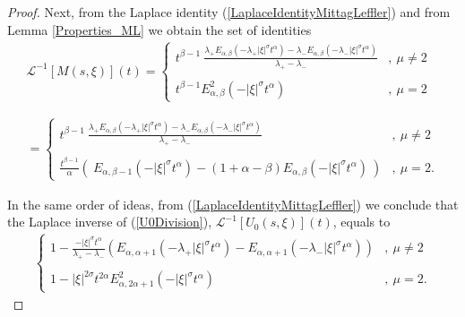 \documentclass{amsart}
\theoremstyle{definition}
\theoremstyle{remark}
\numberwithin{equation}{section}
\begin{document}
\begin{proof}
	Next, from the Laplace identity (\ref{LaplaceIdentityMittagLeffler}) and from Lemma \ref{Properties_ML} we obtain the set of identities
	\begin{eqnarray}\label{MLaplaceInverse}
			\mathcal{L}^{-1}[M(s,\xi)](t)=
			\begin{cases}
				\displaystyle 	t^{\beta-1}~\frac{\lambda_+E_{\alpha,\beta}(-\lambda_+|\xi|^\sigma t^\alpha)-\lambda_-E_{\alpha,\beta}(-\lambda_-|\xi|^\sigma t^\alpha)}{\lambda_+-\lambda_-}&,~\mu\neq 2 \\ \ \\
				\displaystyle t^{\beta-1}E_{\alpha,\beta}^2(-|\xi|^\sigma t^{\alpha})&,~\mu= 2
			\end{cases}\nonumber \\ \nonumber \\ \nonumber \\ 
			=
			\begin{cases}
				\displaystyle 	t^{\beta-1}~\frac{\lambda_+E_{\alpha,\beta}(-\lambda_+|\xi|^\sigma t^\alpha)-\lambda_-E_{\alpha,\beta}(-\lambda_-|\xi|^\sigma t^\alpha)}{\lambda_+-\lambda_-}&,~\mu\neq 2 \\ \ \\
				\displaystyle \frac{t^{\beta-1}}{\alpha}\left(~E_{\alpha,\beta-1}(-|\xi|^\sigma t^{\alpha})-(1+\alpha-\beta)E_{\alpha,\beta}(-|\xi|^\sigma t^{\alpha})~\right)&,~\mu= 2.
			\end{cases} 
	\end{eqnarray}
	
	In the same order of ideas, from (\ref{LaplaceIdentityMittagLeffler}) 
	we conclude that the Laplace inverse of (\ref{U0Division}), $\mathcal{L}^{-1}[U_0(s,\xi)](t)$, equals to
	\begin{eqnarray*}
			\begin{cases}
				\displaystyle 	1-\frac{-|\xi|^\sigma t^\alpha}{\lambda_+-\lambda_-}\left(E_{\alpha,\alpha+1}(-\lambda_+|\xi|^\sigma t^\alpha)-E_{\alpha,\alpha+1}(-\lambda_-|\xi|^\sigma t^\alpha)\right) &,~\mu\neq 2 \\ \ \\
				\displaystyle 1-|\xi|^{2\sigma}t^{2\alpha}E_{\alpha,2\alpha+1}^2(-|\xi|^\sigma t^{\alpha})&,~\mu= 2.
			\end{cases}
	\end{eqnarray*}
	

\end{proof}
\end{document}
